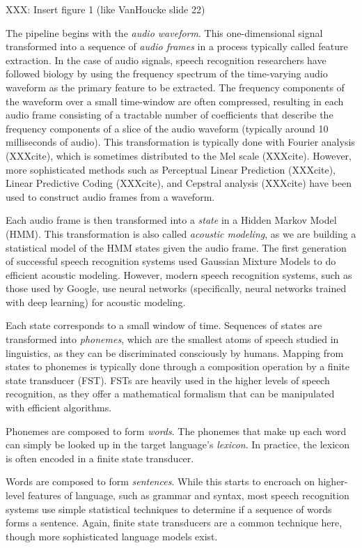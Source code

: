 \documentclass{article}
\begin{document}
XXX: Insert figure 1 (like VanHoucke slide 22)

The pipeline begins with the \textit{audio waveform}.
This one-dimensional signal transformed
into a sequence of \textit{audio frames}
in a process typically called feature extraction.
In the case of audio signals,
speech recognition researchers have followed
biology by using the frequency spectrum
of the time-varying audio waveform
as the primary feature to be extracted.
The frequency components of the waveform
over a small time-window are often compressed,
resulting in each audio frame consisting of
a tractable number of coefficients
that describe the frequency components
of a slice of the audio waveform
(typically around 10 milliseconds of audio).
This transformation is typically done
with Fourier analysis (XXXcite),
which is sometimes distributed
to the Mel scale (XXXcite).
However, more sophisticated methods
such as Perceptual Linear Prediction (XXXcite),
Linear Predictive Coding (XXXcite),
and Cepstral analysis (XXXcite) have been
used to construct audio frames from a waveform.

Each audio frame is then transformed
into a \textit{state}
in a Hidden Markov Model (HMM).
This transformation is also called
\textit{acoustic modeling},
as we are building a statistical model
of the HMM states given the audio frame.
The first generation of successful
speech recognition systems
used Gaussian Mixture Models
to do efficient acoustic modeling.
However, modern speech recognition systems,
such as those used by Google,
use neural networks
(specifically, neural networks trained with deep learning)
for acoustic modeling.

Each state corresponds to a small window of time.
Sequences of states are transformed
into \textit{phonemes},
which are the smallest atoms of speech
studied in linguistics,
as they can be discriminated consciously by humans.
Mapping from states to phonemes
is typically done through a composition operation
by a finite state transducer (FST).
FSTs are heavily used in the higher levels
of speech recognition,
as they offer a mathematical formalism
that can be manipulated with efficient algorithms.

Phonemes are composed to form \textit{words}.
The phonemes that make up each word
can simply be looked up
in the target language's \textit{lexicon}.
In practice, the lexicon is often encoded
in a finite state transducer.

Words are composed to form \textit{sentences}.
While this starts to encroach
on higher-level features of language,
such as grammar and syntax,
most speech recognition systems
use simple statistical techniques
to determine if a sequence of words
forms a sentence.
Again, finite state transducers
are a common technique here,
though more sophisticated language models exist.
\end{document}
